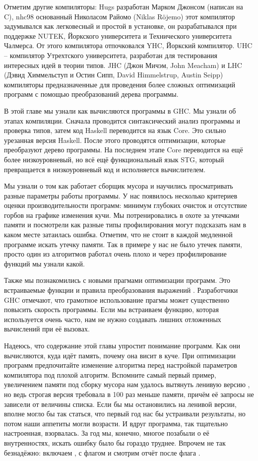 Отметим другие компиляторы: Hugs разработан Марком
Джонсом (написан на C), nhc98 основанный Николасом Райомо 
(Niklas Röjemo) этот компилятор задумывался как легковесный
и простой в установке, он разрабатывался при поддержке
NUTEK, Йоркского университета и Технического университета Чалмерса. 
От этого компилятора отпочковался YHC, Йоркский компилятор. 
UHC -- компилятор Утрехтского университета, разработан
для тестирования интересных идей в теории типов. 
JHC (Джон Мичэм,  John Meacham) и LHC 
(Дэвид Химмельступ и Остин Сипп, David Himmelstrup, Austin Seipp)
компиляторы предназначенные для проведения более
сложных оптимизаций программ с помощью преобразований
дерева программы.

В этой главе мы узнали как вычисляются программы в GHC.
Мы узнали об этапах компиляции. Сначала проводится
синтаксический анализ программы и проверка типов,
затем код Haskell переводится на язык Core. Это
сильно урезанная версия Haskell. После этого проводятся
оптимизации, которые преобразуют дерево программы.
На последнем этапе Core переводится на ещё более
низкоуровневый, но всё ещё функциональный язык STG,
который превращается в низкоуровневый код и исполняется
вычислителем. 

Мы узнали о том как работает сборщик мусора и научились
просматривать разные параметры работы программы. У нас 
появилось несколько критериев оценки производительности программ:
минимум глубоких очисток и отсутствие горбов на графике 
изменения кучи. Мы потренировались в охоте за утечками памяти
и посмотрели как разные типы профилирования могут подсказать
нам в каком месте затаилась ошибка. Отметим, что не стоит 
в каждой медленной программе искать утечку памяти. Так
в примере  у нас не было утечек памяти,
просто один из алгоритмов работал очень плохо и
через профилирование функций мы узнали какой. 

Также мы познакомились с новыми прагмами оптимизации
программ. Это встраиваемые функции  
и правила преобразования выражений . 
Разработчики GHC отмечают, что грамотное использование
прагмы  может существенно повысить 
скорость программы. Если мы встраиваем функцию, которая 
используется очень часто, нам не нужно создавать лишних
отложенных вычислений при её вызовах. 

Надеюсь, что содержание этой главы упростит понимание
программ. Как они вычисляются, куда идёт память,
почему она висит в куче. При оптимизации программ
предпочитайте изменение алгоритма перед настройкой 
параметров компилятора под плохой алгоритм. 
Вспомните самый первый пример, увеличением памяти
под сборку мусора нам удалось вытянуть ленивую
версию , но ведь строгая версия требовала
в 100 раз меньше памяти, причём её запросы не зависели
от величины списка. Если бы мы остановились на ленивой
версии, вполне могло бы так статься, что первый год
нас бы устраивали результаты, но потом
наши аппетиты могли возрасти. И вдруг программа,
так тщательно настроенная, взорвалась. За год
мы, конечно, многое позабыли о её внутренностях,
искать ошибку было бы гораздо труднее. Впрочем
не так безнадёжно: включаем , 
с флагом  и смотрим отчёт после флага .

